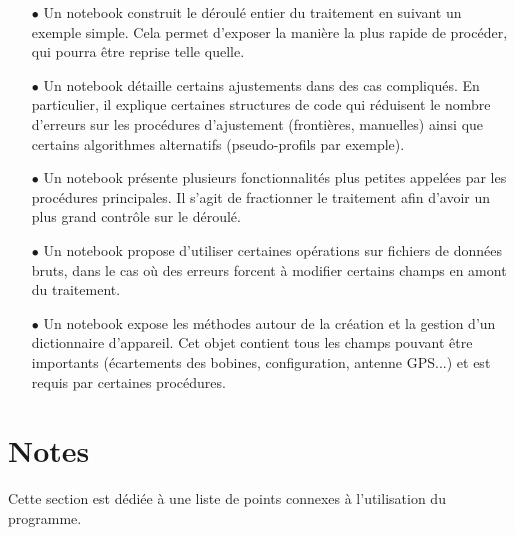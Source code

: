 \documentclass[12pt]{article}
\begin{document}
    \begin{enumerate}
        \item[$\bullet$] Un notebook construit le déroulé entier du traitement en suivant un exemple simple. Cela permet d'exposer la manière la plus rapide de procéder, qui pourra être reprise telle quelle.

        \item[$\bullet$] Un notebook détaille certains ajustements dans des cas compliqués. En particulier, il explique certaines structures de code qui réduisent le nombre d'erreurs sur les procédures d'ajustement (frontières, manuelles) ainsi que certains algorithmes alternatifs (pseudo-profils par exemple).

        \item[$\bullet$] Un notebook présente plusieurs fonctionnalités plus petites appelées par les procédures principales. Il s'agit de fractionner le traitement afin d'avoir un plus grand contrôle sur le déroulé.
        
        \item[$\bullet$] Un notebook propose d'utiliser certaines opérations sur fichiers de données bruts, dans le cas où des erreurs forcent à modifier certains champs en amont du traitement.

        \item[$\bullet$] Un notebook expose les méthodes autour de la création et la gestion d'un dictionnaire d'appareil. Cet objet contient tous les champs pouvant être importants (écartements des bobines, configuration, antenne GPS...) et est requis par certaines procédures.
    \end{enumerate}

\newpage
\section{Notes}

    Cette section est dédiée à une liste de points connexes à l'utilisation du programme.
\end{document}
